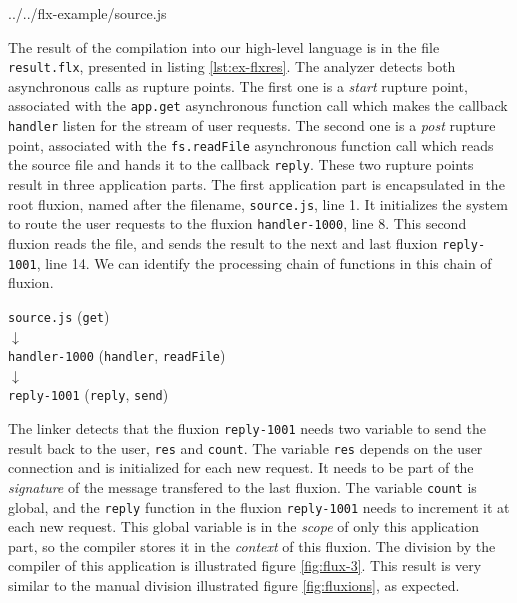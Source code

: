 {../../flx-example/source.js}

The result of the compilation into our high-level language is in the file \texttt{result.flx}, presented in listing \ref{lst:ex-flxres}.
The analyzer detects both asynchronous calls as rupture points.
The first one is a \textit{start} rupture point, associated with the \texttt{app.get} asynchronous function call which makes the callback \texttt{handler} listen for the stream of user requests. 
The second one is a \textit{post} rupture point, associated with the \texttt{fs.readFile} asynchronous function call which reads the source file and hands it to the callback \texttt{reply}.
These two rupture points result in three application parts.
The first application part is encapsulated in the root fluxion, named after the filename, \texttt{source.js}, line 1.
It initializes the system to route the user requests to the fluxion \texttt{handler-1000}, line 8.
This second fluxion reads the file, and sends the result to the next and last fluxion \texttt{reply-1001}, line 14.
We can identify the processing chain of functions in this chain of fluxion.

\begin{center}
\texttt{source.js} (\texttt{get})\\
$\downarrow$\\
\texttt{handler-1000} (\texttt{handler}, \texttt{readFile})\\
$\downarrow$\\
\texttt{reply-1001} (\texttt{reply}, \texttt{send})
\end{center}

The linker detects that the fluxion \texttt{reply-1001} needs two variable to send the result back to the user, \texttt{res} and \texttt{count}.
The variable \texttt{res} depends on the user connection and is initialized for each new request.
It needs to be part of the \textit{signature} of the message transfered to the last fluxion.
The variable \texttt{count} is global, and the \texttt{reply} function in the fluxion \texttt{reply-1001} needs to increment it at each new request.
This global variable is in the \textit{scope} of only this application part, so the compiler stores it in the \textit{context} of this fluxion.
The division by the compiler of this application is illustrated figure \ref{fig:flux-3}.
This result is very similar to the manual division illustrated figure \ref{fig:fluxions}, as expected.


